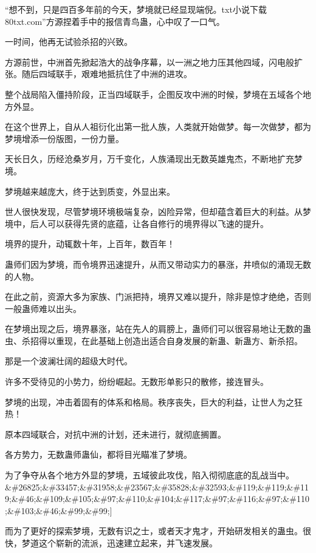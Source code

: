 
\begin{this_body}

“想不到，只是四百多年前的今天，梦境就已经显现端倪。txt小说下载80txt.com”方源捏着手中的报信青鸟蛊，心中叹了一口气。

一时间，他再无试验杀招的兴致。

方源前世，中洲首先掀起浩大的战争序幕，以一洲之地力压其他四域，闪电般扩张。随后四域联手，艰难地抵抗住了中洲的进攻。

整个战局陷入僵持阶段，正当四域联手，企图反攻中洲的时候，梦境在五域各个地方外显。

在这个世界上，自从人祖衍化出第一批人族，人类就开始做梦。每一次做梦，都为梦境增添一份版图，一份力量。

天长日久，历经沧桑岁月，万千变化，人族涌现出无数英雄鬼杰，不断地扩充梦境。

梦境越来越庞大，终于达到质变，外显出来。

世人很快发现，尽管梦境环境极端复杂，凶险异常，但却蕴含着巨大的利益。从梦境中，后人可以获得先贤的底蕴，让各自修行的境界得以飞速的提升。

境界的提升，动辄数十年，上百年，数百年！

蛊师们因为梦境，而令境界迅速提升，从而又带动实力的暴涨，井喷似的涌现无数的人物。

在此之前，资源大多为家族、门派把持，境界又难以提升，除非是惊才绝绝，否则一般蛊师难以出头。

在梦境出现之后，境界暴涨，站在先人的肩膀上，蛊师们可以很容易地让无数的蛊虫、杀招得以重现，在此基础上创造出适合自身发展的新蛊、新蛊方、新杀招。

那是一个波澜壮阔的超级大时代。

许多不受待见的小势力，纷纷崛起。无数形单影只的散修，接连冒头。

梦境的出现，冲击着固有的体系和格局。秩序丧失，巨大的利益，让世人为之狂热！

原本四域联合，对抗中洲的计划，还未进行，就彻底搁置。

各方势力，无数蛊师蛊仙，都将目光瞄准了梦境。

为了争夺从各个地方外显的梦境，五域彼此攻伐，陷入彻彻底底的乱战当中。\&\#26825;\&\#33457;\&\#31958;\&\#23567;\&\#35828;\&\#32593;\&\#119;\&\#119;\&\#119;\&\#46;\&\#109;\&\#105;\&\#97;\&\#110;\&\#104;\&\#117;\&\#97;\&\#116;\&\#97;\&\#110;\&\#103;\&\#46;\&\#99;\&\#99;]

而为了更好的探索梦境，无数有识之士，或者天才鬼才，开始研发相关的蛊虫。很快，梦道这个崭新的流派，迅速建立起来，并飞速发展。


\end{this_body}
